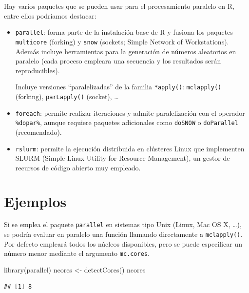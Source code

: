 \documentclass[
]{book}
\newenvironment{Shaded}{\begin{snugshade}}{\end{snugshade}}
\newcommand{\FunctionTok}[1]{\textcolor[rgb]{0.00,0.00,0.00}{#1}}
\newcommand{\NormalTok}[1]{#1}
\newcommand{\OtherTok}[1]{\textcolor[rgb]{0.56,0.35,0.01}{#1}}
\theoremstyle{break}
\theoremstyle{nonumberplain}
\begin{document}
Hay varios paquetes que se pueden usar para el procesamiento paralelo en R,
entre ellos podríamos destacar:

\begin{itemize}
\item
  \texttt{parallel}: forma parte de la instalación base de R y fusiona los paquetes \texttt{multicore} (forking) y \texttt{snow} (sockets; Simple Network of Workstations).
  Además incluye herramientas para la generación de números aleatorios en paralelo (cada proceso empleara una secuencia y los resultados serán reproducibles).

  Incluye versiones ``paralelizadas'' de la familia \texttt{*apply()}:
  \texttt{mclapply()} (forking), \texttt{parLapply()} (socket), \ldots{}
\item
  \texttt{foreach}: permite realizar iteraciones y admite paralelización con el operador \texttt{\%dopar\%}, aunque requiere paquetes adicionales como \texttt{doSNOW} o \texttt{doParallel} (recomendado).
\item
  \texttt{rslurm}: permite la ejecución distribuida en clústeres Linux que implementen SLURM (Simple Linux Utility for Resource Management), un gestor de recursos de código abierto muy empleado.
\end{itemize}

\hypertarget{ejemplos}{%
\section{Ejemplos}\label{ejemplos}}

Si se emplea el paquete \texttt{parallel} en sistemas tipo Unix (Linux, Mac OS X, \ldots), se podría evaluar en paralelo una función llamando directamente a \texttt{mclapply()}.
Por defecto empleará todos los núcleos disponibles, pero se puede especificar un número menor mediante el argumento \texttt{mc.cores}.

\begin{Shaded}
\begin{Highlighting}[]
\FunctionTok{library}\NormalTok{(parallel)}
\NormalTok{ncores }\OtherTok{\textless{}{-}} \FunctionTok{detectCores}\NormalTok{()}
\NormalTok{ncores}
\end{Highlighting}
\end{Shaded}

\begin{verbatim}
## [1] 8
\end{verbatim}
\end{document}
